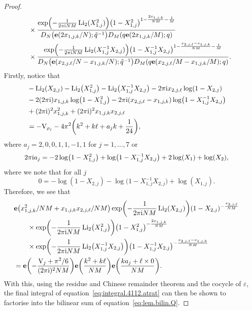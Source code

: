 \documentclass[pdftex]{sigma}
\numberwithin{equation}{section}
\def\tq{\tilde{q}}
\def\Li{\mathrm{Li}}
\def\e{\mathbf e}
\def\VC{\mathrm{VC}}
\def\CYCDS{D}
\def\etaroots{\varepsilon}
\def\tq{\tilde{q}}
\def\Li{\operatorname{Li}}
\def\VC{\mathrm{V}}
\begin{document}
\begin{proof}
\begin{align*}
 &\quad \times \frac{\exp\Bigl(-\frac{1}{2\pi {\rm i}NM}\Li_{2}(X_{1,j}^2)\Bigr)\bigl(1-X_{1,j}^2\bigr)^{1-\frac{2x_{1,j,k}}{NM}-\frac{1}{M}}}{\CYCDS_{N}\bigl(\e(2x_{1,j,k}/N);\tq^{-1}\bigr) \CYCDS_{M}(q\e(2x_{1,j,k}/M);q)}\\
 & \quad \times\frac{\exp\Bigl(-\frac{1}{2\pi {\rm i}NM}\Li_{2}(X_{1,j}^{-1}X_{2,j})\Bigr)\bigl(1-X_{1,j}^{-1}X_{2,j}\bigr)^{1-\frac{x_{2,j,\ell}-x_{1,j,k}}{NM} -\frac{1}{M}}}{\CYCDS_{N}\bigl(\e(x_{2,j,\ell}/N-x_{1,j,k}/N);\tq^{-1}\bigr)\CYCDS_{M}(q\e(x_{2,j,\ell}/M-x_{1,j,k}/M);q)} .
\end{align*}
Firstly, notice that
\begin{align*}
 &-\Li_{2}(X_{2,j})-\Li_{2}\bigl(X_{1,j}^2\bigr)-\Li_{2}\bigl(X_{1,j}^{-1}X_{2,j}\bigr)-2\pi {\rm i}x_{2,j,\ell}\log(1-X_{2,j})\\
 &-2(2\pi {\rm i})x_{1,j,k}\log\bigl(1-X_{1,j}^2\bigr)-2\pi {\rm i}(x_{2,j,\ell}-x_{1,j,k})\log\bigl(1-X_{1,j}^{-1}X_{2,j}\bigr)\\
 &+(2\pi {\rm i})^2x_{1,j,k}^2+(2\pi {\rm i})^2x_{1,j,k}x_{2,j,\ell}\\
 & =
 -\VC_{\rho_j}-4\pi^2\biggl(k^2+k\ell+a_jk+\frac{1}{24}\biggr),
\end{align*}
where $a_{j}=2,0,0,1,1,-1,1$ for $j=1,\dots,7$ or
\[
 2\pi {\rm i}a_{j}
  =
 -2\log\bigl(1-X_{1,j}^2\bigr)+\log\bigl(1-X_{1,j}^{-1}X_{2,j}\bigr)+2\log(X_1)+\log(X_2),
\]
where we note that for all $j$
\[
 0 =-\log(1-X_{2,j})-\log\bigl(1-X_{1,j}^{-1}X_{2,j}\bigr)+\log(X_{1,j}) .
\]
Therefore, we see that
\begin{align*}
 &\e\bigl(x_{1,j,k}^2/NM+x_{1,j,k}x_{2,j,\ell}/NM\bigr)
 \exp\biggl(-\frac{1}{2\pi {\rm i}NM}\Li_{2}(X_{2,j})\biggr)(1-X_{2,j})^{-\frac{x_{2,j,\ell}}{NM}}
 \\
 &\qquad\times\exp\biggl(-\frac{1}{2\pi {\rm i}NM}\Li_{2}\bigl(X_{1,j}^2\bigr)\biggr)\bigl(1-X_{1,j}^2\bigr)^{-\frac{2x_{1,j,k}}{NM}}
 \\
 &\qquad\times\exp\biggl(-\frac{1}{2\pi {\rm i}NM}\Li_{2}\bigl(X_{1,j}^{-1}X_{2,j}\bigr)\biggr)\bigl(1-X_{1,j}^{-1}X_{2,j}\bigr)^{-\frac{x_{2,j,\ell}-x_{1,j,k}}{NM}}\\
 & =
 \e\biggl(-\frac{\VC_{j}+\pi^2/6}{(2\pi {\rm i})^2NM}\biggr)
 \e\biggl(\frac{k^2+k\ell}{NM}\biggr)
 \e\biggl(\frac{ka_j+\ell\times0}{NM}\biggr) .
\end{align*}
With this, using the residue and Chinese remainder theorem and the cocycle of $\etaroots$, the final integral of equation~\eqref{eq:integral.4112.atrat} can then be shown to factorise into the bilinear sum of equation~\eqref{eq:lem.bilin.Q}.
\end{proof}
\end{document}
